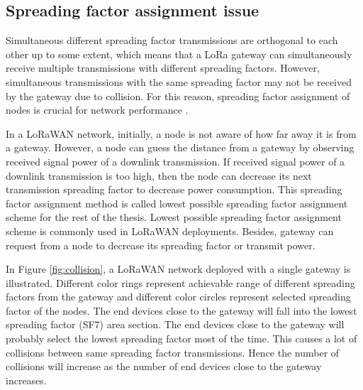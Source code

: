\subsection{Spreading factor assignment issue}

Simultaneous different spreading factor transmissions are orthogonal to each other up to some extent, which means that a LoRa gateway can simultaneously receive multiple transmissions with different spreading factors. However, simultaneous transmissions with the same spreading factor may not be received by the gateway due to collision. For this reason, spreading factor assignment of nodes is crucial for network performance \cite{8030482}.

In a LoRaWAN network, initially, a node is not aware of how far away it is from a gateway. However, a node can guess the distance from a gateway by observing received signal power of a downlink transmission. If received signal power of a downlink transmission is too high, then the node can decrease its next transmission spreading factor to decrease power consumption. This spreading factor assignment method is called lowest possible spreading factor assignment scheme for the rest of the thesis. Lowest possible spreading factor assignment scheme is commonly used in LoRaWAN deployments. Besides, gateway can request from a node to decrease its spreading factor or transmit power.

In Figure \ref{fig:collision}, a LoRaWAN network deployed with a single gateway is illustrated. Different color rings represent achievable range of different spreading factors from the gateway and different color circles represent selected spreading factor of the nodes. The end devices close to the gateway will fall into the lowest spreading factor (SF7) area section. The end devices close to the gateway will probably select the lowest spreading factor most of the time. This causes a lot of collisions between same spreading factor transmissions. Hence the number of collisions will increase as the number of end devices close to the gateway increases.

